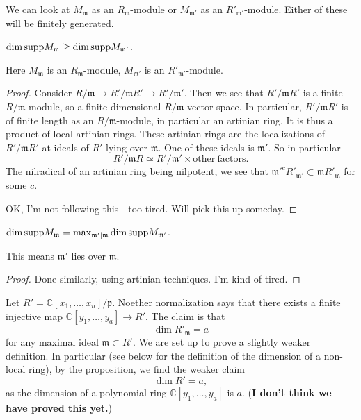 We can look at $M_{\mathfrak{m}}$ as an $R_{\mathfrak{m}}$-module or
$M_{\mathfrak{m}'}$ as an $R'_{\mathfrak{m}'}$-module. Either of these will be
finitely generated. 

\begin{proposition} 
$\dim \mathrm{supp} M_{\mathfrak{m}}  \geq \dim \mathrm{supp} M_{\mathfrak{m}'}$.
\end{proposition} 
Here $M_{\mathfrak{m}}$ is an $R_{\mathfrak{m}}$-module, $M_{\mathfrak{m}'}$ is
an $R'_{\mathfrak{m}'}$-module. 

\begin{proof} 
Consider $R/\mathfrak{m} \to R'/\mathfrak{m} R' \to R'/\mathfrak{m}'$. Then we
see that $R'/\mathfrak{m} R'$ is a finite $R/\mathfrak{m}$-module, so a
finite-dimensional $R/\mathfrak{m}$-vector space. In particular,
$R'/\mathfrak{m} R'$ is of finite length as an $R/\mathfrak{m}$-module, in
particular an artinian ring. It is thus a product of local artinian rings.
These artinian rings are the localizations of $R'/\mathfrak{m}R'$ at ideals of
$R'$ lying over $\mathfrak{m}$. One of these ideals is $\mathfrak{m}'$. 
So in particular
\[ R'/\mathfrak{m}R \simeq R'/\mathfrak{m}'\times \mathrm{other \ factors}.  \]
The nilradical of an artinian ring being nilpotent, we see that
$\mathfrak{m}'^c R'_{\mathfrak{m}'} \subset \mathfrak{m} R'_{\mathfrak{m}}$ for
some $c$.

OK, I'm not following this---too tired. Will pick this up someday.
\end{proof} 


\begin{proposition} 
$\dim \mathrm{supp} M_{\mathfrak{m}} = \max_{\mathfrak{m}' \mid \mathfrak{m}} \dim
\mathrm{supp} M_{\mathfrak{m}'}$.
\end{proposition} 

This means $\mathfrak{m}'$ lies over $\mathfrak{m}$.
\begin{proof} 
Done similarly, using artinian techniques. I'm kind of tired.
\end{proof} 

\begin{example} 
Let $R' = \mathbb{C}[x_1, \dots, x_n]/\mathfrak{p}$. Noether normalization says
that there exists a finite injective map $\mathbb{C}[y_1, \dots, y_a] \to R'$.
The claim is that
\[ \dim R'_{\mathfrak{m}} =a  \]
for any maximal ideal $\mathfrak{m} \subset R'$. We are set up to prove a
slightly weaker definition. In particular (see below for the definition of the
dimension of a non-local ring), by the proposition, we
find the weaker claim
\[ \dim R' = a,  \]
as the dimension of a polynomial ring $\mathbb{C}[y_1, \dots, y_a]$ is $a$.
(\textbf{I don't think we have proved this yet.})
\end{example} 


